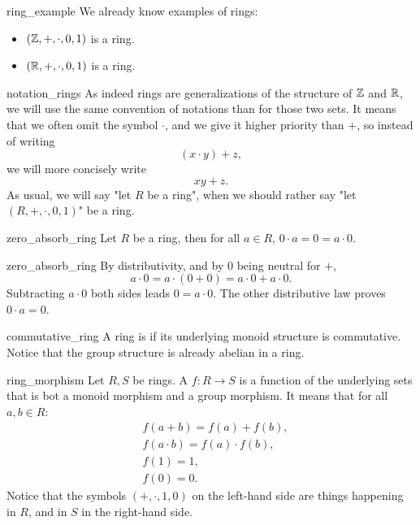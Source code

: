 \begin{cexp}{}{ring_example}
    We already know examples of rings:
    \begin{itemize}
        \item \( (\mathbb{Z}, +, \cdot, 0, 1) \) is a ring.
        \item \( (\mathbb{R}, +, \cdot, 0, 1) \) is a ring.
    \end{itemize}
\end{cexp}

\begin{crem}{}{notation_rings}
    As indeed rings are generalizations of the structure of \( \mathbb{Z} \) and \( \mathbb{R} \), we will use the same convention of notations than for those two sets. It means that we often omit the symbol \( \cdot \), and we give it higher priority than \( + \), so instead of writing
    \begin{equation*}
        (x\cdot y) + z,
    \end{equation*}
    we will more concisely write
    \begin{equation*}
        xy + z.
    \end{equation*}
    As usual, we will say "let \( R \) be a ring", when we should rather say "let \( (R, +, \cdot, 0, 1) \)" be a ring. 
\end{crem}

\begin{clem}{}{zero_absorb_ring}
    Let \( R \) be a ring, then for all \( a \in R \), \( 0\cdot a = 0 = a \cdot 0 \).
\end{clem}
\begin{lemproof}{zero_absorb_ring}
    By distributivity, and by \( 0 \) being neutral for \( + \),
    \begin{equation*}
        a \cdot 0 = a \cdot (0 + 0) = a\cdot 0 + a \cdot 0.        
    \end{equation*}
    Subtracting \( a\cdot 0 \) both sides leads \( 0 = a \cdot 0 \). The other distributive law proves \( 0\cdot a = 0 \).
\end{lemproof}

\begin{cdef}{}{commutative_ring}
    A ring is  if its underlying monoid structure is commutative. Notice that the group structure is already abelian in a ring.
\end{cdef}

\begin{cdef}{}{ring_morphism}
    Let \( R, S \) be rings. A  \( f : R \to S \) is a function of the underlying sets that is bot a monoid morphism and a group morphism. It means that for all \( a, b \in R \):
    \begin{align*}
        &f(a + b) = f(a) + f(b), \\
        &f(a\cdot b) = f(a)\cdot f(b), \\
        &f(1) = 1, \\
        &f(0) = 0.  
    \end{align*}
    Notice that the symbols \( (+, \cdot, 1, 0) \) on the left-hand side are things happening in \( R \), and in \( S \) in the right-hand side.
\end{cdef}

